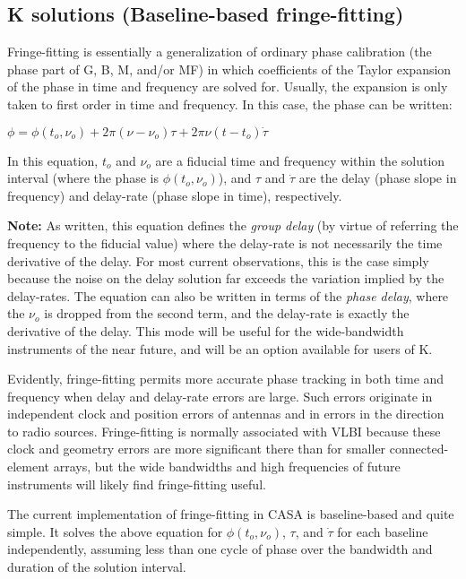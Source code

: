 \subsection{K solutions (Baseline-based fringe-fitting)}
\label{section:caltool.BLcal.k}

Fringe-fitting is essentially a generalization of ordinary phase
calibration (the phase part of G, B, M, and/or MF) in which
coefficients of the Taylor expansion of the phase in time and frequency
are solved for.  Usually, the expansion is only taken to first order
in time and frequency.  In this case, the phase can be written:

$ \phi = \phi(t_o,\nu_o) + 2\pi(\nu - \nu_o)\tau + 2\pi\nu(t - t_o)\dot{\tau}$

In this equation, $t_o$ and $\nu_o$ are a fiducial time and frequency
within the solution interval (where the phase is $\phi(t_o,\nu_o)$),
and $\tau$ and $\dot{\tau}$ are the delay (phase slope in frequency)
and delay-rate (phase slope in time), respectively.

{\bf Note:} As written, this equation defines the {\it group delay}
(by virtue of referring the frequency to the fiducial value) where the
delay-rate is not necessarily the time derivative of the delay. For
most current observations, this is the case simply because the noise
on the delay solution far exceeds the variation implied by the
delay-rates.  The equation can also be written in terms of the {\it
phase delay}, where the $\nu_o$ is dropped from the second term, and
the delay-rate is exactly the derivative of the delay.  This mode will
be useful for the wide-bandwidth instruments of the near future, and
will be an option available for users of K.

Evidently, fringe-fitting permits more accurate phase tracking in both
time and frequency when delay and delay-rate errors are large.  Such
errors originate in independent clock and position errors of antennas
and in errors in the direction to radio sources.  Fringe-fitting is
normally associated with VLBI because these clock and geometry errors
are more significant there than for smaller connected-element arrays,
but the wide bandwidths and high frequencies of future instruments
will likely find fringe-fitting useful.

The current implementation of fringe-fitting in CASA is baseline-based
and quite simple.  It solves the above equation for $\phi(t_o,\nu_o)$,
$\tau$, and $\dot{\tau}$ for each baseline independently, assuming
less than one cycle of phase over the bandwidth and duration of the
solution interval.

